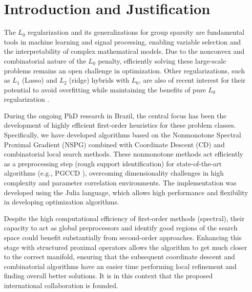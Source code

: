 \section{Introduction and Justification}

The $L_0$ regularization and its generalizations for group sparsity are fundamental tools in machine learning and signal processing, enabling variable selection and the interpretability of complex mathematical models. Due to the nonconvex and combinatorial nature of the $L_0$ penalty, efficiently solving these large-scale problems remains an open challenge in optimization. Other regularizations, such as $L_1$ (Lasso) and $L_2$ (ridge) hybrids with $L_0$, are also of recent interest for their potential to avoid overfitting while maintaining the benefits of pure $L_0$ regularization \cite{fastselect}.

During the ongoing PhD research in Brazil, the central focus has been the development of highly efficient first-order heuristics for these problem classes. Specifically, we have developed algorithms based on the Nonmonotone Spectral Proximal Gradient (NSPG) combined with Coordinate Descent (CD) and combinatorial local search methods. These nonmonotone methods act efficiently as a preprocessing step (rough support identification) for state-of-the-art algorithms (e.g., PGCCD \cite{fastselect}), overcoming dimensionality challenges in high complexity and parameter correlation environments. The implementation was developed using the Julia language, which allows high performance and flexibility in developing optimization algorithms.

Despite the high computational efficiency of first-order methods (spectral), their capacity to act as global preprocessors and identify good regions of the search space could benefit substantially from second-order approaches. Enhancing this stage with structured proximal operators allows the algorithm to get much closer to the correct manifold, ensuring that the subsequent coordinate descent and combinatorial algorithms have an easier time performing local refinement and finding overall better solutions. It is in this context that the proposed international collaboration is founded.

